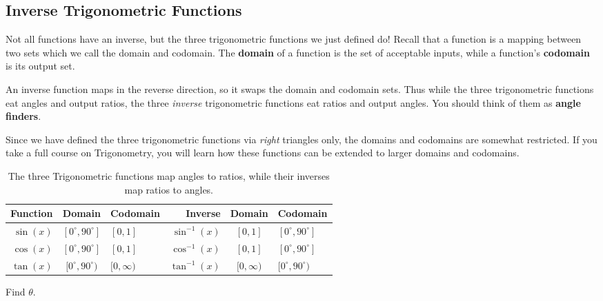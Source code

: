 \newpage

\subsection{Inverse Trigonometric Functions}%
\label{sub:inverse-trigonometric-functions}

Not all functions have an inverse, but the three trigonometric
functions we just defined do! Recall that a function is a mapping
between two sets which we call the domain and codomain. The
\textbf{domain} of a function is the set of acceptable inputs, while a
function's \textbf{codomain} is its output set.

An inverse function maps in the reverse direction, so it swaps the
domain and codomain sets. Thus while the three trigonometric functions
eat angles and output ratios, the three \emph{inverse} trigonometric
functions eat ratios and output angles. You should think of them as
\textbf{angle finders}.

Since we have defined the three trigonometric functions via
\emph{right} triangles only, the domains and codomains are somewhat
restricted. If you take a full course on Trigonometry, you will learn
how these functions can be extended to larger domains and codomains.

\begin{table}[h]
  \centering
  \begin{tabular}{r@{ : }c@{ \(\mapsto\) }lr@{ : }c@{ \(\mapsto\) }l}
    \toprule
    Function
    & Domain
    & Codomain
    & Inverse
    & Domain
    & Codomain \\
    \midrule
    \(\sin(x)\)
    & \([0^{\circ}, 90^{\circ}]\)
    & \([0,1]\)
    & \(\sin^{-1}(x)\)
    & \([0,1]\)
    & \([0^{\circ}, 90^{\circ}]\) \\
    \(\cos(x)\)
    & \([0^{\circ}, 90^{\circ}]\)
    & \([0,1]\)
    & \(\cos^{-1}(x)\)
    & \([0,1]\)
    & \([0^{\circ}, 90^{\circ}]\) \\
    \(\tan(x)\)
    & \([0^{\circ}, 90^{\circ})\)
    & \([0,\infty)\)
    & \(\tan^{-1}(x)\)
    & \([0,\infty)\)
    & \([0^{\circ}, 90^{\circ})\) \\
    \bottomrule
  \end{tabular}
  \caption{The three Trigonometric functions map angles to ratios,
    while their inverses map ratios to angles.}%
  \label{tab:domain-range-trig-funcs}
\end{table}

\begin{exercise}
  Find \(\theta\).

  

\end{exercise}


